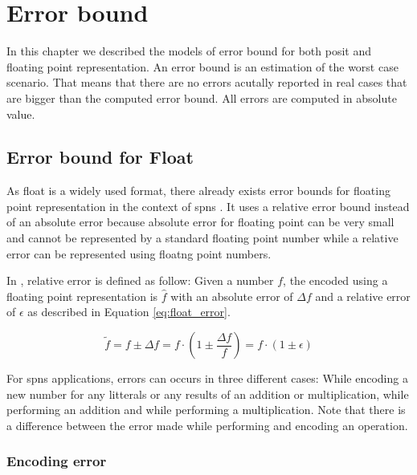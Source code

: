 
\chapter{Error bound}
\label{cha:eb}

In this chapter we described the models of error bound for both posit and floating point representation. An error bound is an estimation of the worst case scenario. That means that there are no errors acutally reported in real cases that are bigger than the computed error bound. All errors are computed in absolute value.

\section{Error bound for Float}
As float is a widely used format, there already exists error bounds for floating point representation in the context of \glspl{spn} \cite{errorbound_float}. It uses a relative error bound instead of an absolute error because absolute error for floating point can be very small and cannot be represented by a standard floating point number while a relative error can be represented using floatng point numbers.

In \cite{errorbound_float}, relative error is defined as follow: Given a number $f$, the encoded using a floating point representation is $\hat{f}$ with an absolute error of $\Delta f$ and a relative error of $\epsilon$ as described in Equation \ref{eq:float_error}.

\begin{equation}
	\tilde{f} = f \pm \Delta f = f \cdot \left(1 \pm \frac{\Delta f}{f} \right) = f \cdot (1 \pm \epsilon)
	\label{eq:float_error}
\end{equation}

For \glspl{spn} applications, errors can occurs in three different cases: While encoding a new number for any litterals or any results of an addition or multiplication, while performing an addition and while performing a multiplication. Note that there is a difference between the error made while performing and encoding an operation.

\subsection{Encoding error}

